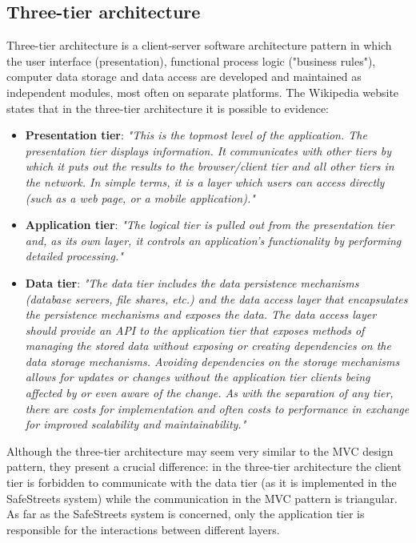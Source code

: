 \subsection{Three-tier architecture}
Three-tier architecture is a client-server software architecture pattern in which the user interface (presentation), functional process logic ("business rules"), computer data storage and data access are developed and maintained as independent modules, most often on separate platforms. The Wikipedia website states that in the three-tier architecture it is possible to evidence:
\begin{itemize}
    \item \textbf{Presentation tier}: 
    \textit{"This is the topmost level of the application. The presentation tier displays information. It communicates with other tiers by which it puts out the results to the browser/client tier and all other tiers in the network. In simple terms, it is a layer which users can access directly (such as a web page, or a mobile application)."}
    \item \textbf{Application tier}: \textit{"The logical tier is pulled out from the presentation tier and, as its own layer, it controls an application’s functionality by performing detailed processing."}
    \item \textbf{Data tier}: \textit{"The data tier includes the data persistence mechanisms\\ (database servers, file shares, etc.) and the data access layer that encapsulates the persistence mechanisms and exposes the data. The data access layer should provide an API to the application tier that exposes methods of managing the stored data without exposing or creating dependencies on the data storage mechanisms. Avoiding dependencies on the storage mechanisms allows for updates or changes without the application tier clients being affected by or even aware of the change. As with the separation of any tier, there are costs for implementation and often costs to performance in exchange for improved scalability and maintainability."}
\end{itemize}
Although the three-tier architecture may seem very similar to the MVC design pattern, they present a crucial difference: in the three-tier architecture the client tier is forbidden to communicate with the data tier (as it is implemented in the SafeStreets system) while the communication in the MVC pattern is triangular. As far as the SafeStreets system is concerned, only the application tier is responsible for the interactions between different layers.
